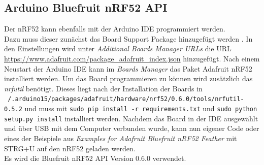 \subsection{Arduino Bluefruit nRF52 API}
Der nRF52 kann ebenfalls mit der Arduino IDE programmiert werden.\\
Dazu muss dieser zunächst das Board Support Package hinzugefügt werden \cite{fried2017nrf}.
In den Einstellungen wird unter \textit{Additional Boards Manager URLs} die URL \url{https://www.adafruit.com/package_adafruit_index.json} hinzugefügt.
Nach einem Neustart der Arduino IDE kann im \textit{Boards Manager} das Paket Adafruit nRF52 installiert werden.
Um das Board programmieren zu können wird zusätzlich das \textit{nrfutil} benötigt.
Dieses liegt nach der Installation der Boards in \\\texttt{~/.arduino15/packages/adafruit/hardware/nrf52/0.6.0/tools/nrfutil-0.5.2} und muss mit \texttt{sudo pip install -r requirements.txt} und \texttt{sudo python setup.py install} installiert werden.
Nachdem das Board in der IDE ausgewählt und über USB mit dem Computer verbunden wurde, kann nun eigener Code oder eines der Beispiele aus \textit{Examples for Adafruit Bluefruit nRF52 Feather} mit STRG+U auf den nRF52 geladen werden.\\
Es wird die Bluefruit nRF52 API Version 0.6.0 verwendet.

